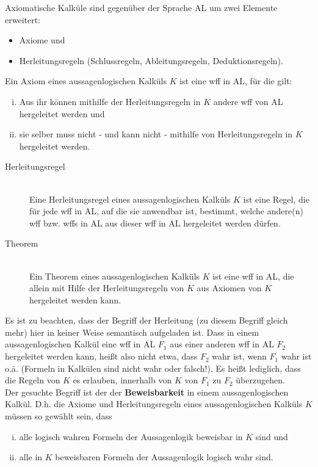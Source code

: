 \documentclass{scrartcl}
\begin{document}
Axiomatische Kalküle sind gegenüber der Sprache AL um zwei Elemente erweitert:
\begin{itemize}
	\item Axiome und
	\item Herleitungsregeln (Schlussregeln, Ableitungsregeln, Deduktionsregeln).
\end{itemize}

Ein Axiom eines aussagenlogischen Kalküls $ K $ ist eine wff in AL, für die gilt:
\begin{enumerate}[(i)]
	\item Aus ihr können mithilfe der Herleitungsregeln in $ K $ andere wff von AL hergeleitet werden und
	\item sie selber muss nicht - und kann nicht - mithilfe von Herleitungsregeln in $ K $ hergeleitet werden.
\end{enumerate}

\begin{description}
	\item[Herleitungsregel] \mbox{}\\ Eine Herleitungsregel eines aussagenlogischen Kalküls $ K $ ist eine Regel, die für jede wff in AL, auf die sie anwendbar ist, bestimmt, welche andere(n) wff bzw. wffs in AL aus dieser wff in AL hergeleitet werden dürfen.
\end{description}

\begin{description}
	\item[Theorem] \mbox{}\\ Ein Theorem eines aussagenlogischen Kalküls $ K $ ist eine wff in AL, die allein mit Hilfe der Herleitungsregeln von $ K $ aus Axiomen von $ K $ hergeleitet werden kann.
\end{description}

Es ist zu beachten, dass der Begriff der Herleitung (zu diesem Begriff gleich mehr) hier in keiner Weise semantisch aufgeladen ist. Dass in einem aussagenlogischen Kalkül eine wff in AL $ F_1 $ aus einer anderen wff in AL $ F_2 $ hergeleitet werden kann, heißt also nicht etwa, dass $ F_2 $ wahr ist, wenn $ F_1 $ wahr ist o.ä. (Formeln in Kalkülen sind nicht wahr oder falsch!). Es heißt lediglich, dass die Regeln von $ K $ es erlauben, innerhalb von $ K $ von $ F_1 $ zu $ F_2 $ überzugehen. \\

Der gesuchte Begriff ist der der \textbf{Beweisbarkeit} in einem aussagenlogischen Kalkül. D.h. die Axiome und Herleitungsregeln eines aussagenlogischen Kalküls $ K $ müssen so gewählt sein, dass
\begin{enumerate}[(i)]
	\item alle logisch wahren Formeln der Aussagenlogik beweisbar in $ K $ sind und
	\item alle in $ K $ beweisbaren Formeln der Aussagenlogik logisch wahr sind.
\end{enumerate}
\end{document}
